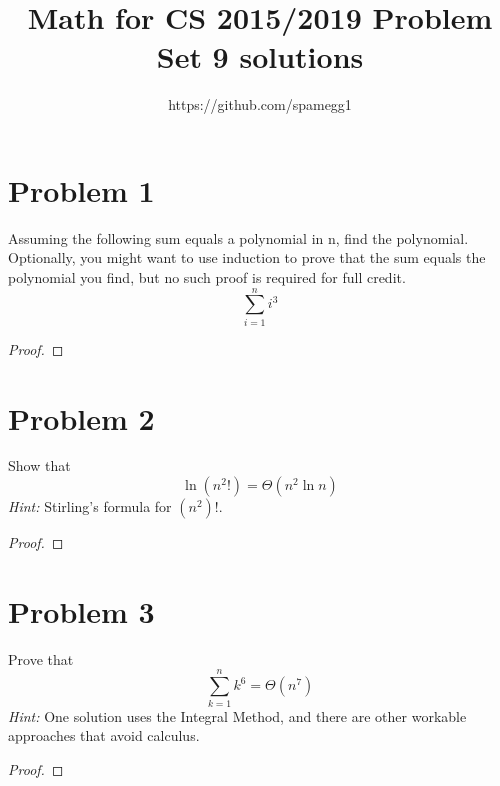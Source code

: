 \documentclass[14pt]{extarticle}
\title{Math for CS 2015/2019 Problem Set 9 solutions}
\author{https://github.com/spamegg1}
\begin{document}
\maketitle
\tableofcontents

\section{Problem 1}
Assuming the following sum equals a polynomial in n, find the polynomial. Optionally, you might want to use induction to prove that the sum equals the polynomial you find, but no such proof is required for full credit.
$$
\sum_{i = 1}^{n}i^3
$$
\begin{proof}
\end{proof}

\section{Problem 2}
Show that
$$
\ln(n^2!) = \Theta(n^2\ln n)
$$
{\it Hint:} Stirling's formula for $(n^2)!$.
\begin{proof}
\end{proof}

\section{Problem 3}
Prove that
$$
\sum_{k=1}^n k^6 = \Theta(n^7)
$$
{\it Hint:} One solution uses the Integral Method, and there are other workable approaches that avoid calculus.
\begin{proof}
\end{proof}
\end{document}
